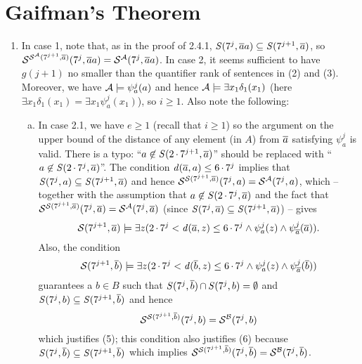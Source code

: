 \section{Gaifman's Theorem}
\begin{enumerate}[1.]
%
\item {} In case 1, note that, as in the proof of 2.4.1, $\ball(7^j, \vect{a}a) \subseteq \ball(7^{j + 1}, \vect{a})$, so $\ballstrct[{\ballstrct[\strct{A}](7^{j + 1}, \vect{a})}](7^j, \vect{a}a) = \ballstrct[\strct{A}](7^j, \vect{a}a)$.
\newpar
In case 2, it seems sufficient to have $g(j + 1)$ no smaller than the quantifier rank of sentences in (2) and (3). Moreover, we have $\mathcal{A} \models \psi^j_a(a)$ and hence $\mathcal{A} \models \exists x_1 \delta_1(x_1)$ (here $\exists x_1 \delta_1(x_1) = \exists x_1 \psi^j_a(x_1)$), so $i \geq 1$. Also note the following:
\begin{enumerate}[(a)]
\item In case 2.1, we have $e \geq 1$ (recall that $i \geq 1$) so the argument on the upper bound of the distance of any element (in $A$) from $\overline{a}$ satisfying $\psi^j_a$ is valid. There is a typo: ``$a \not\in \ball(2 \mul 7^{j + 1}, \vect{a})$'' should be replaced with ``$a \not\in \ball(2 \mul 7^j, \vect{a})$''. The condition $\dist(\vect{a}, a) \leq 6 \mul 7^j$ implies that $\ball(7^j, a) \subseteq \ball(7^{j + 1}, \vect{a})$ and hence $\ballstrct[\ballstrct(7^{j + 1}, \vect{a})](7^j, a) = \ballstrct[\strct{A}](7^j, a)$, which -- together with the assumption that $a \not\in \ball(2 \mul 7^j, \vect{a})$ and the fact that $\ballstrct[\ballstrct(7^{j + 1}, \vect{a})](7^j, \vect{a}) = \ballstrct[\strct{A}](7^j, \vect{a})$ (since $\ball(7^j, \vect{a}) \subseteq \ball(7^{j + 1}, \vect{a})$) -- gives
\[
\ballstrct(7^{j + 1}, \vect{a}) \satis \exists z (2 \mul 7^j < \dist(\vect{a}, z) \leq 6 \mul 7^j \land \psi^j_a(z) \land \psi^j_{\vect{a}}(\vect{a})).
\]
Also, the condition
\[
\ballstrct(7^{j + 1}, \vect{b}) \satis \exists z (2 \mul 7^j < \dist(\vect{b}, z) \leq 6 \mul 7^j \land \psi^j_a(z) \land \psi^j_{\vect{a}}(\vect{b}))
\]
guarantees a $b \in B$ such that $\ball(7^j, \vect{b}) \intsc \ball(7^j, b) = \emptyset$ and $\ball(7^j, b) \subseteq \ball(7^{j + 1}, \vect{b})$ and hence
\[
\ballstrct[\ballstrct(7^{j + 1}, \vect{b})](7^j, b) = \ballstrct[\strct{B}](7^j, b)
\]
which justifies (5); this condition also justifies (6) because $\ball(7^j, \vect{b}) \subseteq \ball(7^{j + 1}, \vect{b})$ which implies $\ballstrct[\ballstrct(7^{j + 1}, \vect{b})](7^j, \vect{b}) = \ballstrct[\strct{B}](7^j, \vect{b})$.

\end{enumerate}
\end{enumerate}
